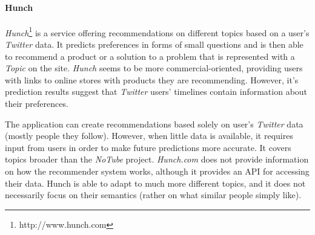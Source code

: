 \paragraph{Hunch}
\textit{Hunch}\footnote{http://www.hunch.com} is a service offering recommendations on different topics based on a user's \textit{Twitter} data. It predicts preferences in forms of small questions and is then able to recommend a product or a solution to a problem that is represented with a \textit{Topic} on the site. \textit{Hunch} seems to be more commercial-oriented, \eg providing users with links to online stores with products they are recommending. However,
it's prediction results suggest that \textit{Twitter} users' timelines contain information about their preferences.

The application can create recommendations based solely on user's \textit{Twitter} data (mostly people they follow). However, when little data is available, it requires input from users in order to make future predictions more accurate. It covers topics broader than the \textit{NoTube} project.
\textit{Hunch.com} does not provide information on how the recommender system works, although it provides an API for accessing their data.
Hunch is able to adapt to much more different topics, and it does not necessarily focus on their semantics (rather on what similar people simply like).
